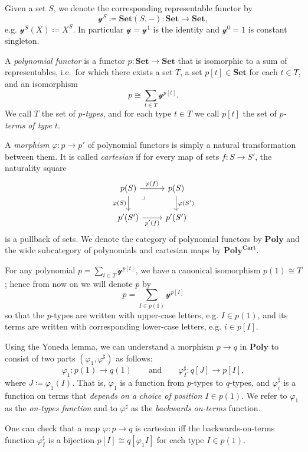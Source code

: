 \documentclass[11pt, one side, article]{memoir}
\theoremstyle{definition}
\theoremstyle{plain}
\newenvironment{remark}
  {\pushQED{\qed}\renewcommand{\qedsymbol}{$\lozenge$}\remarkx}
  {\popQED\endremarkx}
\newenvironment{definition}
  {\pushQED{\qed}\renewcommand{\qedsymbol}{$\lozenge$}\definitionx}
  {\popQED\enddefinitionx}
\newcommand{\Cat}[1]{\mathbf{#1}}%
\newcommand{\smset}{\Cat{Set}}
\newcommand{\yon}{\mathcal{y}}
\newcommand{\poly}{\Cat{Poly}}
\newcommand{\polycart}{\poly^{\Cat{Cart}}}
\newcommand{\0}{\textsf{0}}
\newcommand{\1}{\tn{\textsf{1}}}
\newcommand{\qqand}{\qquad\text{and}\qquad}
\begin{document}
\begin{definition}[Polynomial functor]\label{def.poly}
Given a set $S$, we denote the corresponding representable functor by
\[\yon^S\coloneqq\smset(S,-)\colon\smset\to\smset,\]
e.g. $\yon^S(X)\coloneqq X^S$. In particular $\yon=\yon^1$ is the identity and $\yon^0=1$ is constant singleton.

A \emph{polynomial functor} is a functor $p\colon\smset\to\smset$ that is isomorphic to a sum of representables, i.e.\ for which there exists a set $T$, a set $p[t]\in\smset$ for each $t\in T$, and an isomorphism
\[
p\cong\sum_{t\in T}\yon^{p[t]}.
\]
We call $T$ the set of \emph{$p$-types}, and for each type $t\in T$ we call $p[t]$ the set of \emph{$p$-terms of type $t$}.%

A \emph{morphism} $\varphi\colon p\to p'$ of polynomial functors is simply a natural transformation between them. It is called \emph{cartesian} if for every map of sets $f\colon S\to S'$, the naturality square
\[
\begin{tikzcd}
  p(S)\ar[r, "p(f)"]\ar[d, "\varphi(S)"']&p(S)\ar[d, "\varphi(S')"]\\
  p'(S')\ar[r, "p'(f)"']&p'(S')\ar[ul, phantom, very near end, "\lrcorner"]
\end{tikzcd}
\]
is a pullback of sets. We denote the category of polynomial functors by $\poly$ and the wide subcategory of polynomials and cartesian maps by $\polycart$.\end{definition}

For any polynomial $p=\sum_{t\in T}\yon^{p[t]}$, we have a canonical isomorphism $p(1)\cong T$; hence from now on we will denote $p$ by
\begin{equation}\label{eqn.poly_notation}
p=\sum_{I\in p(1)}\yon^{p[I]}
\end{equation}
so that the $p$-types are written with upper-case letters, e.g. $I\in p(1)$, and its terms are written with corresponding lower-case letters, e.g. $i\in p[I]$.

\begin{remark}\label{rem.positions_and_directions}
Using the Yoneda lemma, we can understand a morphism $p\to q$ in $\poly$ to consist of two parts $(\varphi_1,\varphi^\sharp)$ as follows:
\begin{equation}\label{eqn.mapsharp}
  \varphi_1\colon p(1)\to q(1)
  \qqand
  \varphi^\sharp_I\colon q[J]\to p[I],
\end{equation}
where $J\coloneqq\varphi_1(I)$. That is, $\varphi_1$ is a function from $p$-types to $q$-types, and $\varphi^\sharp_i$ is a function on terms that \emph{depends on a choice of position $I\in p(1)$}. We refer to $\varphi_1$ as the \emph{on-types function} and to $\varphi^\sharp$ as the \emph{backwards on-terms} function.

One can check that a map $\varphi\colon p\to q$ is cartesian iff the backwards-on-terms function $\varphi^\sharp_I$ is a bijection $p[I]\cong q[\varphi_1I]$ for each type $I\in p(1)$.
\end{remark}




\printbibliography 
\end{document}
